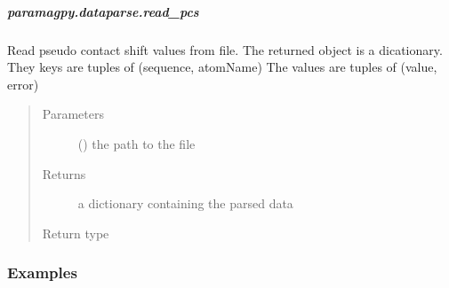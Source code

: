 \documentclass[a4paper,10pt,english]{sphinxmanual}
\begin{document}
\subparagraph{paramagpy.dataparse.read\_pcs}
\label{\detokenize{reference/generated/paramagpy.dataparse.read_pcs:paramagpy-dataparse-read-pcs}}\label{\detokenize{reference/generated/paramagpy.dataparse.read_pcs::doc}}

\begin{fulllineitems}
\label{\detokenize{reference/generated/paramagpy.dataparse.read_pcs:paramagpy.dataparse.read_pcs}}
Read pseudo contact shift values from file.
The returned object is a dicationary.
They keys are tuples of (sequence, atomName)
The values are tuples of (value, error)
\begin{quote}\begin{description}
\item[{Parameters}] \leavevmode
{} () \textendash{} the path to the file

\item[{Returns}] \leavevmode
{} \textendash{} a dictionary containing the parsed data

\item[{Return type}] \leavevmode
{\hyperref[\detokenize{reference/generated/paramagpy.dataparse.DataContainer:paramagpy.dataparse.DataContainer}]{}}

\end{description}\end{quote}
\subsubsection*{Examples}

%
\begin{sphinxVerbatim}[commandchars=\\\{\}]
  
   
    
\end{sphinxVerbatim}

\end{fulllineitems}
\end{document}
